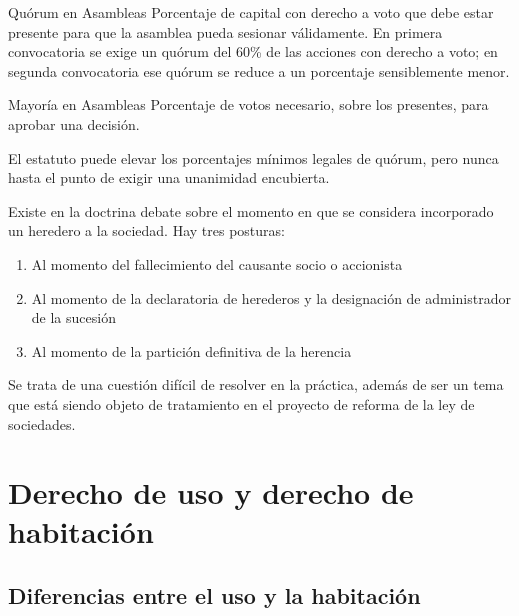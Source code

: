 \documentclass[12pt,oneside]{book}
\begin{document}
\begin{definition}{Quórum en Asambleas}
Porcentaje de capital con derecho a voto que debe estar presente para que la asamblea pueda sesionar válidamente. En primera convocatoria se exige un quórum del 60\% de las acciones con derecho a voto; en segunda convocatoria ese quórum se reduce a un porcentaje sensiblemente menor.
\end{definition}

\begin{definition}{Mayoría en Asambleas}
Porcentaje de votos necesario, sobre los presentes, para aprobar una decisión.
\end{definition}

\begin{important}
El estatuto puede elevar los porcentajes mínimos legales de quórum, pero nunca hasta el punto de exigir una unanimidad encubierta.
\end{important}

Existe en la doctrina debate sobre el momento en que se considera incorporado un heredero a la sociedad. Hay tres posturas:

\begin{enumerate}
\item Al momento del fallecimiento del causante socio o accionista
\item Al momento de la declaratoria de herederos y la designación de administrador de la sucesión
\item Al momento de la partición definitiva de la herencia
\end{enumerate}

Se trata de una cuestión difícil de resolver en la práctica, además de ser un tema que está siendo objeto de tratamiento en el proyecto de reforma de la ley de sociedades.


\chapter{Derecho de uso y derecho de habitación}

\section{Diferencias entre el uso y la habitación}
\end{document}
